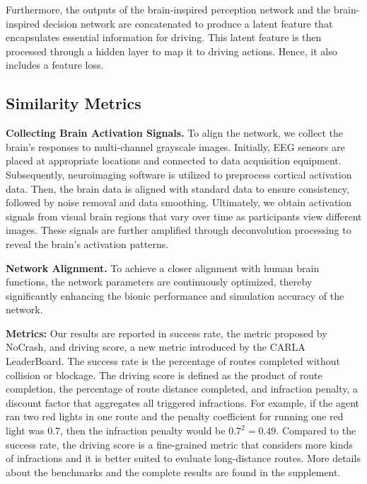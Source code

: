Furthermore, the outputs of the brain-inspired perception network and the brain-inspired decision network are concatenated to produce a latent feature that encapsulates essential information for driving. This latent feature is then processed through a hidden layer to map it to driving actions. Hence, it also includes a feature loss.

\subsection{Similarity Metrics}
\hspace{1pc}\textbf{\textsf{Collecting Brain Activation Signals.}} To align the network, we collect the brain's responses to multi-channel grayscale images. Initially, EEG sensors are placed at appropriate locations and connected to data acquisition equipment. Subsequently, neuroimaging software is utilized to preprocess cortical activation data. Then, the brain data is aligned with standard data to ensure consistency, followed by noise removal and data smoothing. Ultimately, we obtain activation signals from visual brain regions that vary over time as participants view different images. These signals are further amplified through deconvolution processing to reveal the brain's activation patterns.

\textbf{\textsf{Network Alignment.}} To achieve a closer alignment with human brain functions, the network parameters are continuously optimized, thereby significantly enhancing the bionic performance and simulation accuracy of the network.


\textbf{\textsf{Metrics:}}
Our results are reported in success rate, the metric proposed by NoCrash, and driving score, a new metric introduced by the CARLA LeaderBoard. 
The success rate is the percentage of routes completed without collision or blockage. 
The driving score is defined as the product of route completion, the percentage of route distance completed, and infraction penalty, a discount factor that aggregates all triggered infractions.
For example, if the agent ran two red lights in one route and the penalty coefficient for running one red light was $0.7$, then the infraction penalty would be  $0.7^{2}$$=$$0.49$.
Compared to the success rate, the driving score is a fine-grained metric that considers more kinds of infractions and it is better suited to evaluate long-distance routes.
More details about the benchmarks and the complete results are found in the supplement.


